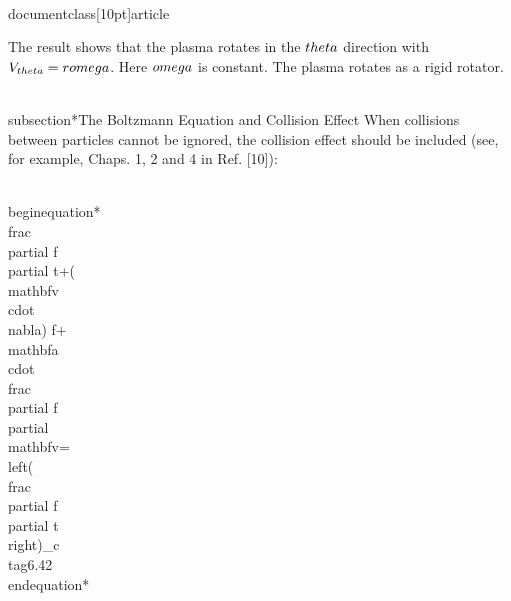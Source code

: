 \\documentclass[10pt]{article}
\begin{document}
{{{{The result shows that the plasma rotates in the $\\theta$ direction with $V_{\\theta}=r \\omega$. Here $\\omega$ is constant. The plasma rotates as a rigid rotator.

\\subsection*{The Boltzmann Equation and Collision Effect}
When collisions between particles cannot be ignored, the collision effect should be included (see, for example, Chaps. 1, 2 and 4 in Ref. [10]):


\\begin{equation*}
\\frac{\\partial f}{\\partial t}+(\\mathbf{v} \\cdot \\nabla) f+\\mathbf{a} \\cdot \\frac{\\partial f}{\\partial \\mathbf{v}}=\\left(\\frac{\\partial f}{\\partial t}\\right)_{c} \\tag{6.42}
\\end{equation*}

}}}}
\end{document}
